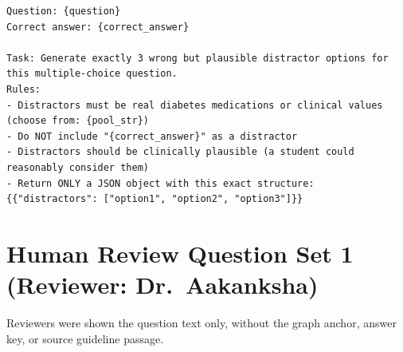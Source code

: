 \begin{lstlisting}[language={},
  basicstyle=\small\ttfamily,
  breaklines=true,
  frame=single,
  caption={User prompt template: MCQ Distractor Generation.}]
Question: {question}
Correct answer: {correct_answer}

Task: Generate exactly 3 wrong but plausible distractor options for this multiple-choice question.
Rules:
- Distractors must be real diabetes medications or clinical values (choose from: {pool_str})
- Do NOT include "{correct_answer}" as a distractor
- Distractors should be clinically plausible (a student could reasonably consider them)
- Return ONLY a JSON object with this exact structure: {{"distractors": ["option1", "option2", "option3"]}}
\end{lstlisting}

\newpage
\section{Human Review Question Set 1 (Reviewer: Dr.~Aakanksha)}
\label{app:review-set-1}

Reviewers were shown the question text only, without the graph anchor,
answer key, or source guideline passage.

